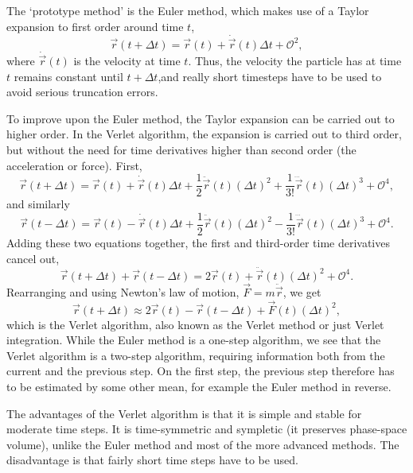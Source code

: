 \documentclass[11pt,bibliography=totoc,index=totoc]{scrbook}   %
\begin{document}
The `prototype method' is the Euler method, which makes use of a Taylor expansion to first order around time $t$,
\begin{equation}
  \vec{r}(t+\Delta t) = \vec{r}(t) + \dot{\vec{r}}(t)\Delta t + \mathcal{O}^2,
\end{equation}
where $\dot{\vec{r}}(t)$ is the velocity at time $t$. Thus, the velocity the particle has at time $t$ remains constant until $t+\Delta t$,and really short timesteps have to be used to avoid serious truncation errors.

To improve upon the Euler method, the Taylor expansion can be carried out to higher order. In the Verlet algorithm,
the expansion is carried out to third order, but without the need for time derivatives higher than second order
(the acceleration or force). First,
\begin{equation}
  \vec{r}(t+\Delta t) = \vec{r}(t) + \dot{\vec{r}}(t)\Delta t + \frac12 \ddot{\vec{r}}(t)(\Delta t)^2
  + \frac{1}{3!} \dddot{\vec{r}}(t)(\Delta t)^3 + \mathcal{O}^4,
\end{equation}
and similarly
\begin{equation}
  \vec{r}(t-\Delta t) = \vec{r}(t) - \dot{\vec{r}}(t)\Delta t + \frac12 \ddot{\vec{r}}(t)(\Delta t)^2
   - \frac{1}{3!} \dddot{\vec{r}}(t)(\Delta t)^3 + \mathcal{O}^4.
\end{equation}
Adding these two equations together, the first and third-order time derivatives cancel out,
\begin{equation}
 \vec{r}(t+\Delta t) + \vec{r}(t-\Delta t) = 2\vec{r}(t) + \ddot{\vec{r}}(t)(\Delta t)^2 + \mathcal{O}^4.
\end{equation}
Rearranging and using Newton's law of motion, $\vec{F}=m\ddot{\vec{r}}$, we get
\begin{equation}
  \vec{r}(t+\Delta t) \approx 2\vec{r}(t) - \vec{r}(t-\Delta t) + \vec{F}(t)(\Delta t)^2,
\end{equation}
which is the Verlet algorithm, also known as the Verlet method or just Verlet integration. 
While the Euler method is a one-step algorithm, we see that the Verlet algorithm is a two-step algorithm, requiring information both from the current and the previous step.
On the first step, the previous step therefore has to be estimated by some other mean, for example the Euler method in reverse.

The advantages of the Verlet algorithm is that it is simple and stable for moderate time steps.
It is time-symmetric and sympletic (it preserves phase-space volume), unlike the Euler method and most of the more advanced methods.
The disadvantage is that fairly short time steps have to be used. 
\end{document}
